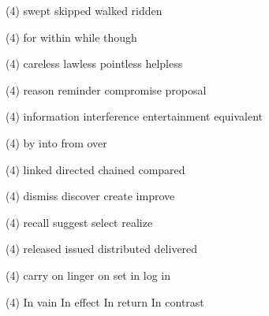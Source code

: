 \item
\begin{tasks}(4)
	\task swept
	\task skipped
	\task walked
	\task ridden
\end{tasks}
\item
\begin{tasks}(4)
	\task for
	\task within
	\task while
	\task though
\end{tasks}
\item
\begin{tasks}(4)
	\task careless
	\task lawless
	\task pointless
	\task helpless
\end{tasks}
\item
\begin{tasks}(4)
	\task reason
	\task reminder
	\task compromise
	\task proposal
\end{tasks}
\item
\begin{tasks}(4)
	\task information
	\task interference
	\task entertainment
	\task equivalent
\end{tasks}
\item
\begin{tasks}(4)
	\task by
	\task into
	\task from
	\task over
\end{tasks}
\item
\begin{tasks}(4)
	\task linked
	\task directed
	\task chained
	\task compared
\end{tasks}
\item
\begin{tasks}(4)
	\task dismiss
	\task discover
	\task create
	\task improve
\end{tasks}
\item
\begin{tasks}(4)
	\task recall
	\task suggest
	\task select
	\task realize
\end{tasks}
\item
\begin{tasks}(4)
	\task released
	\task issued
	\task distributed
	\task delivered
\end{tasks}
\item
\begin{tasks}(4)
	\task carry on
	\task linger on
	\task set in
	\task log in
\end{tasks}
\item
\begin{tasks}(4)
	\task In vain
	\task In effect
	\task In return
	\task In contrast
\end{tasks}
\item
